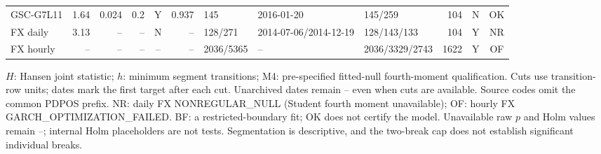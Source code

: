 \documentclass[10pt,a4paper]{article}
\begin{document}
\begin{longtable}{lrrrcrlllrcc}
GSC-G7L11 & 1.64 & 0.024 & 0.2 & Y & 0.937 & 145 & 2016-01-20 & 145/259 & 104 & N & OK\\
FX daily & 3.13 & -- & -- & N & -- & 128/271 & 2014-07-06/2014-12-19 & 128/143/133 & 104 & Y & NR\\
FX hourly & -- & -- & -- & -- & -- & 2036/5365 & -- & 2036/3329/2743 & 1622 & Y & OF\\
\end{longtable}
\noindent\parbox{\linewidth}{\fontsize{8}{9.2}\selectfont $H$: Hansen joint statistic; $h$: minimum segment transitions; M4: pre-specified fitted-null fourth-moment qualification. Cuts use transition-row units; dates mark the first target after each cut. Unarchived dates remain -- even when cuts are available. Source codes omit the common PDPOS prefix. NR: daily FX NONREGULAR\_NULL (Student fourth moment unavailable); OF: hourly FX GARCH\_OPTIMIZATION\_FAILED. BF: a restricted-boundary fit; OK does not certify the model. Unavailable raw $p$ and Holm values remain --; internal Holm placeholders are not tests. Segmentation is descriptive, and the two-break cap does not establish significant individual breaks.}
\endgroup
\end{document}

